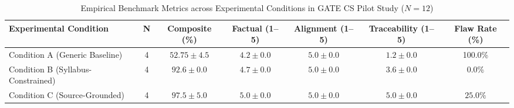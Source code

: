 \begin{table}[t]
\centering
\caption{Empirical Benchmark Metrics across Experimental Conditions in GATE CS Pilot Study ($N=12$)}
\label{tab:summary_metrics}
\begin{tabular}{lcccccc}
\hline
\textbf{Experimental Condition} & \textbf{N} & \textbf{Composite (\%)} & \textbf{Factual (1--5)} & \textbf{Alignment (1--5)} & \textbf{Traceability (1--5)} & \textbf{Flaw Rate (\%)} \\
\hline
Condition A (Generic Baseline) & 4 & $52.75 \pm 4.5$ & $4.2 \pm 0.0$ & $5.0 \pm 0.0$ & $1.2 \pm 0.0$ & 100.0\% \\
Condition B (Syllabus-Constrained) & 4 & $92.6 \pm 0.0$ & $4.7 \pm 0.0$ & $5.0 \pm 0.0$ & $3.6 \pm 0.0$ & 0.0\% \\
Condition C (Source-Grounded) & 4 & $\mathbf{97.5 \pm 5.0}$ & $\mathbf{5.0 \pm 0.0}$ & $\mathbf{5.0 \pm 0.0}$ & $\mathbf{5.0 \pm 0.0}$ & $\mathbf{25.0\%}$ \\
\hline
\end{tabular}
\end{table}
